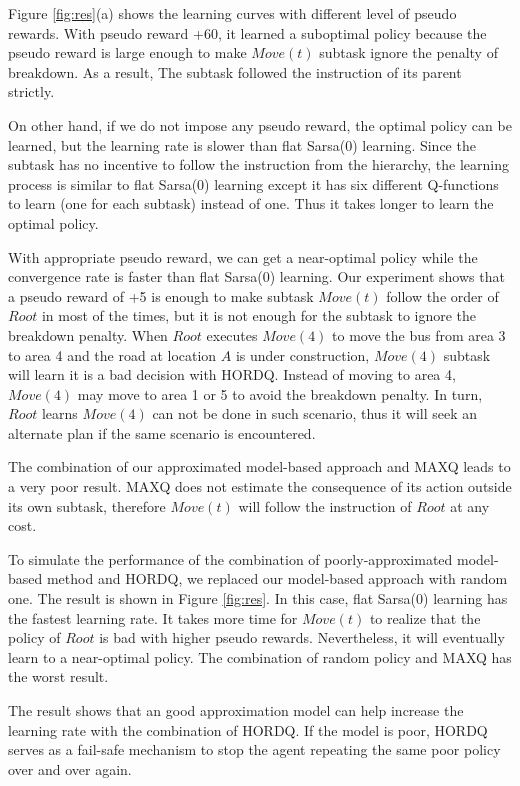 \documentclass{article} %
\begin{document}
Figure \ref{fig:res}(a) shows the learning curves with different level of pseudo rewards.
With pseudo reward +60, it learned a suboptimal policy because
the pseudo reward is large enough to make $Move(t)$ subtask ignore 
the penalty of breakdown. As a result, The subtask followed 
the instruction of its parent strictly.

On other hand, if we do not impose any pseudo reward, 
the optimal policy can be learned, but the learning rate is
slower than flat Sarsa(0) learning. Since the subtask has no
incentive to follow the instruction from the hierarchy, 
the learning process is similar to flat Sarsa(0) learning 
except it has six different Q-functions to learn (one for each subtask) instead of one.
Thus it takes longer to learn the optimal policy. 

With appropriate pseudo reward, we can get a near-optimal policy
while the convergence rate is faster than flat Sarsa(0) learning.
Our experiment shows that a pseudo reward of +5 is enough to make subtask $Move(t)$ follow 
the order of $Root$ in most of the times, but it is not enough for the subtask to ignore
the breakdown penalty. When $Root$ executes $Move(4)$ to move the bus from area 
3 to area 4 and the road at location $A$ is under construction, $Move(4)$ subtask
will learn it is a bad decision with HORDQ.
Instead of moving to area 4, $Move(4)$ may move to area 1 or 5 to avoid
the breakdown penalty. In turn, $Root$ learns $Move(4)$ can not be done in 
such scenario, thus it will seek an alternate plan if the same scenario
is encountered.

The combination of our approximated model-based approach and MAXQ leads 
to a very poor result. MAXQ does not estimate the consequence of its action outside its own subtask, therefore
$Move(t)$ will follow the instruction of $Root$ at any cost.

To simulate the performance of the combination of poorly-approximated model-based method and 
HORDQ, we replaced our model-based approach with random one.
The result is shown in Figure \ref{fig:res}. In this case, flat Sarsa(0) learning has the fastest
learning rate. It takes more time for $Move(t)$ to realize that the policy of $Root$ is bad with higher pseudo rewards.
Nevertheless, it will eventually learn to a near-optimal policy.
The combination of random policy and MAXQ has the worst result.

The result shows that an good approximation model 
can help increase the learning rate with the combination of HORDQ. 
If the model is poor, HORDQ serves as a fail-safe mechanism to stop 
the agent repeating the same poor policy over and over again.
\end{document}

